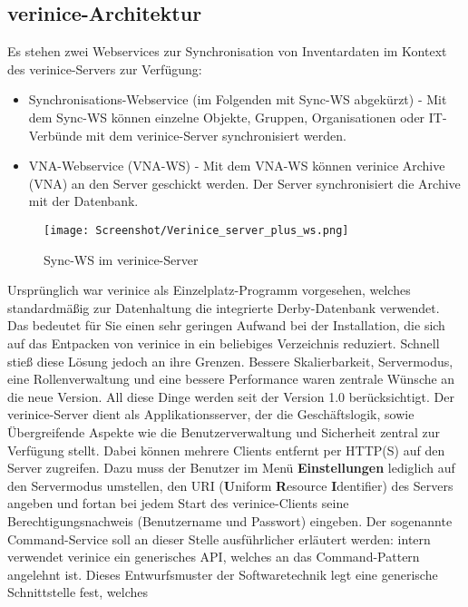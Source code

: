 \documentclass[a4paper,10pt]{book}
\begin{document}
\subsection{verinice-Architektur}
Es stehen zwei Webservices zur Synchronisation von Inventardaten im Kontext des verinice-Servers
zur Verfügung:
\begin{itemize}
 \item Synchronisations-Webservice (im Folgenden mit Sync-WS abgekürzt) - Mit dem Sync-WS können einzelne Objekte, Gruppen, Organisationen oder IT-Verbünde mit dem verinice-Server synchronisiert werden.
 \item VNA-Webservice (VNA-WS) - Mit dem VNA-WS können verinice Archive (VNA) an den Server geschickt werden. Der Server synchronisiert die Archive mit der Datenbank.
\end{itemize}
\begin{figure}[htb!]
  \centering
  \texttt{[image: Screenshot/Verinice\_server\_plus\_ws.png]}
  \caption{\label{Sync-WS im verinice-Server} Sync-WS im verinice-Server}
\end{figure}
\vspace{1cm}
Ursprünglich war verinice als Einzelplatz-Programm vorgesehen, welches standardmäßig zur Datenhaltung
die integrierte Derby-Datenbank verwendet. Das bedeutet für Sie einen sehr geringen Aufwand
bei der Installation, die sich auf das Entpacken von verinice in ein beliebiges Verzeichnis
reduziert. Schnell stieß diese Lösung jedoch an ihre Grenzen. Bessere Skalierbarkeit, Servermodus, eine
Rollenverwaltung und eine bessere Performance waren zentrale Wünsche an die neue Version. All diese
Dinge werden seit der Version 1.0 berücksichtigt.
\newline
Der verinice-Server dient als Applikationsserver, der die Geschäftslogik,
sowie Übergreifende Aspekte wie die Benutzerverwaltung und Sicherheit zentral zur Verfügung stellt.
Dabei können mehrere Clients entfernt per HTTP(S) auf den Server zugreifen. Dazu muss der Benutzer
im Menü \textbf{Einstellungen} lediglich auf den Servermodus umstellen, den URI (\textbf{U}niform \textbf{R}esource
\textbf{I}dentifier) des Servers angeben und fortan bei jedem Start des verinice-Clients seine Berechtigungsnachweis
(Benutzername und Passwort) eingeben.
\newline
Der sogenannte Command-Service soll an dieser Stelle ausführlicher erläutert werden: intern
verwendet verinice ein generisches API, welches an das Command-Pattern angelehnt ist.
Dieses Entwurfsmuster der Softwaretechnik legt eine generische Schnittstelle fest, welches
\end{document}
